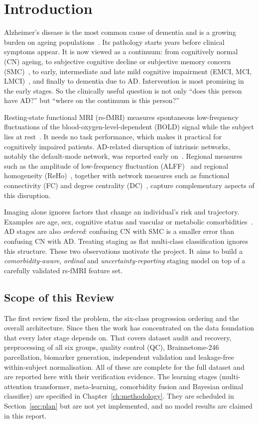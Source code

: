 \documentclass{ssnreview}
\begin{document}
\chapter{Introduction}

Alzheimer's disease is the most common cause of dementia and is a growing
burden on ageing populations~\cite{alz2024,livingston2020}. Its pathology starts
years before clinical symptoms appear. It is now viewed as a continuum: from
cognitively normal (CN) ageing, to subjective cognitive decline or subjective
memory concern (SMC)~\cite{jessen2014}, to early, intermediate and late mild
cognitive impairment (EMCI, MCI, LMCI)~\cite{petersen2010}, and finally to
dementia due to AD. Intervention is most promising in the early stages. So the
clinically useful question is not only ``does this person have AD?'' but
``where on the continuum is this person?''

Resting-state functional MRI (rs-fMRI) measures spontaneous low-frequency
fluctuations of the blood-oxygen-level-dependent (BOLD) signal while the subject
lies at rest~\cite{biswal1995}. It needs no task performance, which makes it
practical for cognitively impaired patients. AD-related disruption of
intrinsic networks, notably the default-mode network, was reported early on~\cite{greicius2004}.
Regional measures such as the amplitude of low-frequency fluctuation
(ALFF)~\cite{zang2007} and regional homogeneity (ReHo)~\cite{zang2004}, together
with network measures such as functional connectivity (FC) and degree
centrality (DC)~\cite{zuo2012}, capture complementary aspects of this
disruption.

Imaging alone ignores factors that change an individual's risk and
trajectory. Examples are age, sex, cognitive status and vascular or metabolic
comorbidities~\cite{livingston2020}. AD stages are
also \emph{ordered}: confusing CN with SMC is a smaller error than confusing CN
with AD. Treating staging as flat multi-class classification ignores this
structure. These two observations motivate the project. It aims to build a
\emph{comorbidity-aware}, \emph{ordinal} and \emph{uncertainty-reporting}
staging model on top of a carefully validated rs-fMRI feature set.

\section{Scope of this Review}
The first review fixed the problem, the six-class progression ordering and the
overall architecture. Since then the work has concentrated on the data
foundation that every later stage depends on. That covers dataset audit and recovery,
preprocessing of all six groups, quality control (QC), Brainnetome-246
parcellation, biomarker generation, independent validation and leakage-free
within-subject normalisation. All of these are complete for the full dataset
and are reported here with their verification evidence. The learning stages
(multi-attention transformer, meta-learning, comorbidity fusion and Bayesian
ordinal classifier) are specified in Chapter~\ref{ch:methodology}. They are scheduled in
Section~\ref{sec:plan} but are not yet implemented, and no model
results are claimed in this report.
\end{document}
